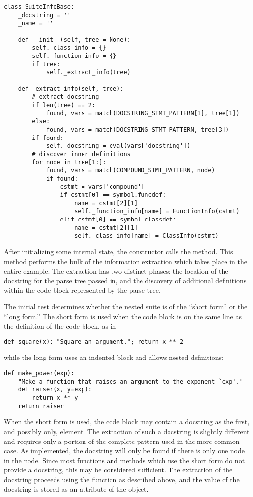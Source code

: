 \begin{verbatim}
class SuiteInfoBase:
    _docstring = ''
    _name = ''

    def __init__(self, tree = None):
        self._class_info = {}
        self._function_info = {}
        if tree:
            self._extract_info(tree)

    def _extract_info(self, tree):
        # extract docstring
        if len(tree) == 2:
            found, vars = match(DOCSTRING_STMT_PATTERN[1], tree[1])
        else:
            found, vars = match(DOCSTRING_STMT_PATTERN, tree[3])
        if found:
            self._docstring = eval(vars['docstring'])
        # discover inner definitions
        for node in tree[1:]:
            found, vars = match(COMPOUND_STMT_PATTERN, node)
            if found:
                cstmt = vars['compound']
                if cstmt[0] == symbol.funcdef:
                    name = cstmt[2][1]
                    self._function_info[name] = FunctionInfo(cstmt)
                elif cstmt[0] == symbol.classdef:
                    name = cstmt[2][1]
                    self._class_info[name] = ClassInfo(cstmt)
\end{verbatim}
%
After initializing some internal state, the constructor calls the
 method.  This method performs the bulk of the
information extraction which takes place in the entire example.  The
extraction has two distinct phases: the location of the docstring for
the parse tree passed in, and the discovery of additional definitions
within the code block represented by the parse tree.

The initial  test determines whether the nested suite is of
the ``short form'' or the ``long form.''  The short form is used when
the code block is on the same line as the definition of the code
block, as in

\begin{verbatim}
def square(x): "Square an argument."; return x ** 2
\end{verbatim}
%
while the long form uses an indented block and allows nested
definitions:

\begin{verbatim}
def make_power(exp):
    "Make a function that raises an argument to the exponent `exp'."
    def raiser(x, y=exp):
        return x ** y
    return raiser
\end{verbatim}
%
When the short form is used, the code block may contain a docstring as
the first, and possibly only,  element.  The
extraction of such a docstring is slightly different and requires only
a portion of the complete pattern used in the more common case.  As
implemented, the docstring will only be found if there is only
one  node in the  node.
Since most functions and methods which use the short form do not
provide a docstring, this may be considered sufficient.  The
extraction of the docstring proceeds using the  function
as described above, and the value of the docstring is stored as an
attribute of the  object.

